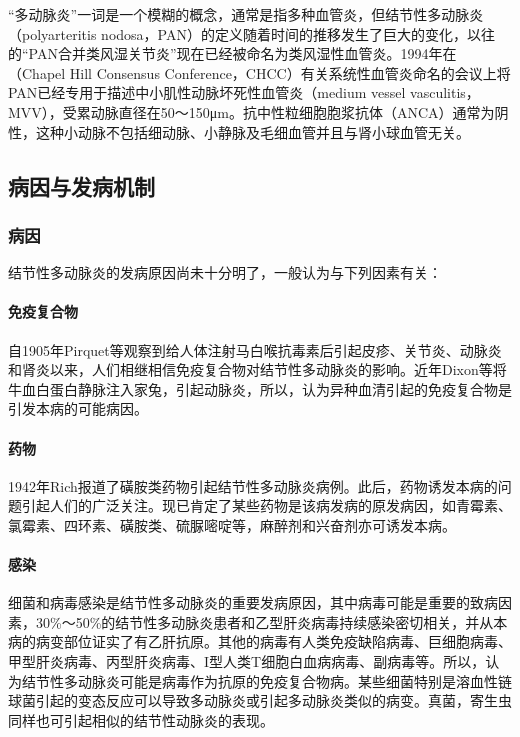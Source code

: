 “多动脉炎”一词是一个模糊的概念，通常是指多种血管炎，但结节性多动脉炎（polyarteritis
nodosa，PAN）的定义随着时间的推移发生了巨大的变化，以往的“PAN合并类风湿关节炎”现在已经被命名为类风湿性血管炎。1994年在（Chapel
Hill Consensus
Conference，CHCC）有关系统性血管炎命名的会议上将PAN已经专用于描述中小肌性动脉坏死性血管炎（medium
vessel
vasculitis，MVV），受累动脉直径在50～150μm。抗中性粒细胞胞浆抗体（ANCA）通常为阴性，这种小动脉不包括细动脉、小静脉及毛细血管并且与肾小球血管无关。

\subsection{病因与发病机制}

\subsubsection{病因}

结节性多动脉炎的发病原因尚未十分明了，一般认为与下列因素有关：

\paragraph{免疫复合物}

自1905年Pirquet等观察到给人体注射马白喉抗毒素后引起皮疹、关节炎、动脉炎和肾炎以来，人们相继相信免疫复合物对结节性多动脉炎的影响。近年Dixon等将牛血白蛋白静脉注入家兔，引起动脉炎，所以，认为异种血清引起的免疫复合物是引发本病的可能病因。

\paragraph{药物}

1942年Rich报道了磺胺类药物引起结节性多动脉炎病例。此后，药物诱发本病的问题引起人们的广泛关注。现已肯定了某些药物是该病发病的原发病因，如青霉素、氯霉素、四环素、磺胺类、硫脲嘧啶等，麻醉剂和兴奋剂亦可诱发本病。

\paragraph{感染}

细菌和病毒感染是结节性多动脉炎的重要发病原因，其中病毒可能是重要的致病因素，30\%～50\%的结节性多动脉炎患者和乙型肝炎病毒持续感染密切相关，并从本病的病变部位证实了有乙肝抗原。其他的病毒有人类免疫缺陷病毒、巨细胞病毒、甲型肝炎病毒、丙型肝炎病毒、I型人类T细胞白血病病毒、副病毒等。所以，认为结节性多动脉炎可能是病毒作为抗原的免疫复合物病。某些细菌特别是溶血性链球菌引起的变态反应可以导致多动脉炎或引起多动脉炎类似的病变。真菌，寄生虫同样也可引起相似的结节性动脉炎的表现。

